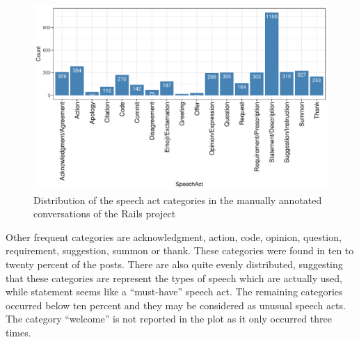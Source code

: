 \begin{figure}
	\centering
	\includegraphics[width=\linewidth]{figures/speechActCount}
	\caption[Speech act categories manually annotated on Rails project]{Distribution of the speech act categories in the manually annotated conversations of the Rails project}
	\label{fig:speechactcount}
\end{figure}


Other frequent categories are acknowledgment, action, code, opinion, question, requirement, suggestion, summon or thank. These categories were found in ten to twenty percent of the posts. There are also quite evenly distributed, suggesting that these categories are represent the types of speech which are actually used, while statement seems like a ``must-have'' speech act. The remaining categories occurred below ten percent and they may be considered as unusual speech acts. The category ``welcome'' is not reported in the plot as it only occurred three times. 




